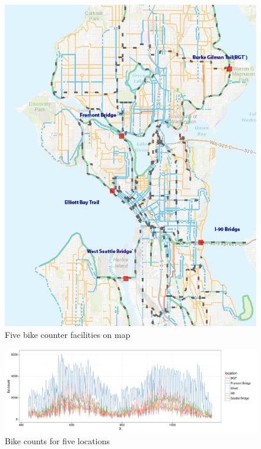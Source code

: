 \documentclass [11pt, proquest] {uwthesis}[2015/03/03]
\begin{document}
\begin{figure}
  \includegraphics[width=1\textwidth]{figures/5sites/5locations} 
 \caption{Five bike counter facilities on map}
 \label{fig:5locations}
\end{figure}

\begin{figure}
  \includegraphics[width=1\textwidth]{figures/5sites/5location_time} 
 \caption{Bike counts for five locations}
 \label{fig:5locations_time}
\end{figure}
\end{document}

